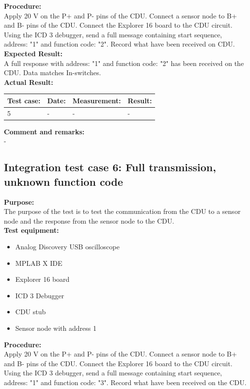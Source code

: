 \textbf{Procedure:}\\
Apply 20 V on the P+ and P- pins of the CDU. Connect a sensor node to B+ and B- pins of the CDU. Connect the Explorer 16 board to the CDU circuit. Using the ICD 3 debugger, send a full message containing start sequence, address: "1" and function code: "2". Record what have been received on CDU.\\

\textbf{Expected Result:}\\
A full response with address: "1" and function code: "2" has been received on the CDU. Data matches In-switches.\\

\textbf{Actual Result:}\\
\begin{table}[H]
\centering
\begin{tabular}{|p{2cm}|p{2cm}|p{3cm}|p{2cm}|}\hline
\textbf{Test case:} & \textbf{Date:} & \textbf{Measurement:} & \textbf{Result:} \\ \hline
5 & - & - & - \\ \hline
\end{tabular}
\end{table}


\textbf{Comment and remarks:}\\
-\\

\subsection{Integration test case 6: Full transmission, unknown function code}
\textbf{Purpose:}\\
The purpose of the test is to test the communication from the CDU to a sensor node and the response from the sensor node to the CDU.\\

\textbf{Test equipment:}
\begin{itemize}
\item Analog Discovery USB oscilloscope
\item MPLAB X IDE
\item Explorer 16 board
\item ICD 3 Debugger
\item CDU stub
\item Sensor node with address 1
\end{itemize}

\textbf{Procedure:}\\
Apply 20 V on the P+ and P- pins of the CDU. Connect a sensor node to B+ and B- pins of the CDU. Connect the Explorer 16 board to the CDU circuit. Using the ICD 3 debugger, send a full message containing start sequence, address: "1" and function code: "3". Record what have been received on the CDU.\\

